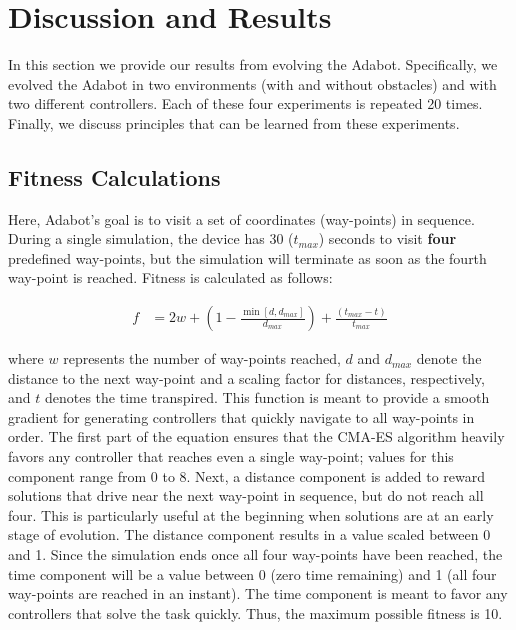 \section{Discussion and Results}
\label{sec:results}

In this section we provide our results from evolving the Adabot.
%
Specifically, we evolved the Adabot in two environments (with and without obstacles) and with two different controllers. Each of these four experiments is repeated 20 times.
%
Finally, we discuss principles that can be learned from these experiments.


\subsection{Fitness Calculations}

%
Here, Adabot's goal is to visit a set of coordinates (way-points) in sequence.
%
During a single simulation, the device has 30 ($t_\mathit{max}$) seconds to visit \textbf{four} predefined way-points, but the simulation will terminate as soon as the fourth way-point is reached.
%
Fitness is calculated as follows:


\begin{align}
    f &= 2w + (1-\frac{\min[d, d_\mathit{max}]}{d_\mathit{max}}) + \frac{(t_\mathit{max} - t)}{t_\mathit{max}}
\end{align}

\noindent
where $w$ represents the number of way-points reached, $d$ and $d_\mathit{max}$ denote the distance to the next way-point and a scaling factor for distances, respectively, and $t$ denotes the time transpired.
%
This function is meant to provide a smooth gradient for generating controllers that quickly navigate to all way-points in order.
%
The first part of the equation ensures that the CMA-ES algorithm heavily favors any controller that reaches even a single way-point; values for this component range from 0 to 8.
%
Next, a distance component is added to reward solutions that drive near the next way-point in sequence, but do not reach all four. This is particularly useful at the beginning when solutions are at an early stage of evolution.
%
The distance component results in a value scaled between 0 and 1.
%
Since the simulation ends once all four way-points have been reached, the time component will be a value between 0 (zero time remaining) and 1 (all four way-points are reached in an instant).
%
The time component is meant to favor any controllers that solve the task quickly.
%
Thus, the maximum possible fitness is 10.


